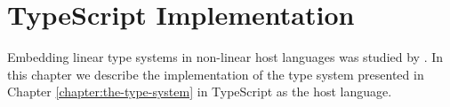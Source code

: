 \chapter{TypeScript Implementation}

Embedding linear type systems in non-linear host languages was studied by \cite{JenniferPaykin2018}. In this chapter we describe the implementation of the type system presented in Chapter \ref{chapter:the-type-system} in TypeScript as the host language.

